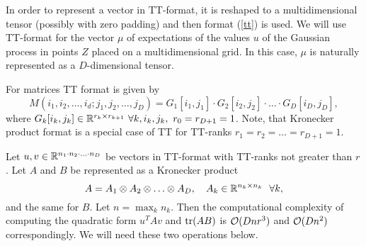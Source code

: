   In order to represent a vector in TT-format, it is reshaped to a multidimensional
  tensor (possibly with zero padding) and then format (\ref{tt}) is used. We will
  use TT-format for the vector $\mu$ of expectations of the values $u$ of the
  Gaussian process in points $Z$ placed on a multidimensional grid. In this case,
  $\mu$ is naturally represented as a $D$-dimensional tensor.

  For matrices TT format is given by
  \[
    M(i_1, i_2, \ldots, i_d; j_1, j_2, \ldots, j_D) = G_1 [i_1, j_1] \cdot
    G_2[i_2, j_2] \cdot \ldots \cdot G_D[i_D, j_D],
  \]
  where $G_k[i_k, j_k] \in \mathbb{R}^{r_k\times r_{k+1}}\ \forall k, i_k, j_k,\ r_0 = r_{D+1} = 1$. Note, that Kronecker product format is a special case of TT for TT-ranks
  $r_1 = r_2 = \ldots = r_{D+1} = 1$.

  Let $u, v \in \mathbb{R}^{n_1 \cdot n_2 \cdot \ldots \cdot n_D}$ be vectors
  in TT-format with TT-ranks not greater than $r$. Let $A$ and $B$ be represented as a Kronecker product
  \[
    A = A_1 \otimes A_2 \otimes \ldots \otimes A_D,~~~A_k \in \mathbb{R}^{n_k \times n_k}~~\forall k,
  \]
  and the same for $B$. Let $n = \max_k n_k$. Then the computational complexity
  of computing the quadratic form $u^T A v$ and $\mbox{tr}(AB)$ is $\mathcal{O}(Dnr^3)$ and $\mathcal{O}(Dn^2)$ correspondingly. We will need these two
  operations below.
